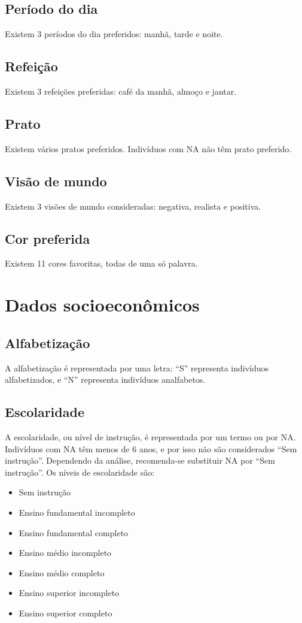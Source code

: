 \documentclass{book}
\begin{document}
\subsection{Período do dia}
Existem 3 períodos do dia preferidos: manhã, tarde e noite.

\subsection{Refeição}
Existem 3 refeições preferidas: café da manhã, almoço e jantar.

\subsection{Prato}
Existem vários pratos preferidos. Indivíduos com NA não têm prato preferido.

\subsection{Visão de mundo}
Existem 3 visões de mundo consideradas: negativa, realista e positiva.

\subsection{Cor preferida}
Existem 11 cores favoritas, todas de uma só palavra.

\section{Dados socioeconômicos}

\subsection{Alfabetização}
A alfabetização é representada por uma letra: ``S'' representa indivíduos alfabetizados, e ``N'' representa indivíduos analfabetos.

\subsection{Escolaridade}
A escolaridade, ou nível de instrução, é representada por um termo ou por NA. Indivíduos com NA têm menos de 6 anos, e por isso não são considerados ``Sem instrução''. Dependendo da análise, recomenda-se substituir NA por ``Sem instrução''. Os níveis de escolaridade são:
\begin{itemize}
  \item Sem instrução
  \item Ensino fundamental incompleto
  \item Ensino fundamental completo
  \item Ensino médio incompleto
  \item Ensino médio completo
  \item Ensino superior incompleto
  \item Ensino superior completo
\end{itemize}
\end{document}
